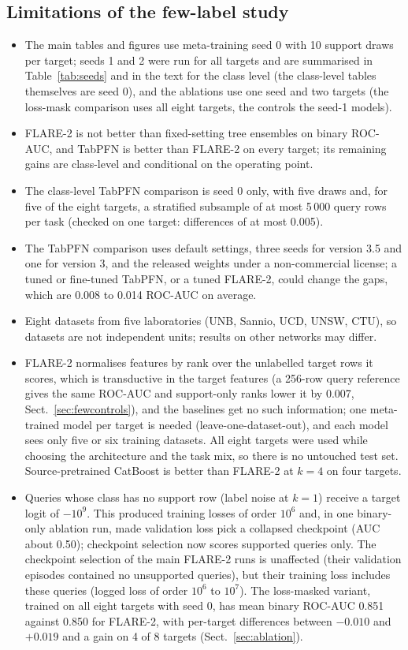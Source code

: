 \documentclass[11pt]{article}
\begin{document}
\subsection{Limitations of the few-label study}
\begin{itemize}
\item The main tables and figures use meta-training seed 0 with 10 support draws per target; seeds 1 and 2 were run for all targets and are summarised in Table~\ref{tab:seeds} and in the text for the class level (the class-level tables themselves are seed 0), and the ablations use one seed and two targets (the loss-mask comparison uses all eight targets, the controls the seed-1 models).
\item FLARE-2 is not better than fixed-setting tree ensembles on binary ROC-AUC, and TabPFN is better than FLARE-2 on every target; its remaining gains are class-level and conditional on the operating point.
\item The class-level TabPFN comparison is seed 0 only, with five draws and, for five of the eight targets, a stratified subsample of at most 5\,000 query rows per task (checked on one target: differences of at most 0.005).
\item The TabPFN comparison uses default settings, three seeds for version 3.5 and one for version 3, and the released weights under a non-commercial license; a tuned or fine-tuned TabPFN, or a tuned FLARE-2, could change the gaps, which are 0.008 to 0.014 ROC-AUC on average.
\item Eight datasets from five laboratories (UNB, Sannio, UCD, UNSW, CTU), so datasets are not independent units; results on other networks may differ.
\item FLARE-2 normalises features by rank over the unlabelled target rows it scores, which is transductive in the target features (a 256-row query reference gives the same ROC-AUC and support-only ranks lower it by 0.007, Sect.~\ref{sec:fewcontrols}), and the baselines get no such information; one meta-trained model per target is needed (leave-one-dataset-out), and each model sees only five or six training datasets. All eight targets were used while choosing the architecture and the task mix, so there is no untouched test set. Source-pretrained CatBoost is better than FLARE-2 at $k=4$ on four targets.
\item Queries whose class has no support row (label noise at $k=1$) receive a target logit of $-10^{9}$. This produced training losses of order $10^{6}$ and, in one binary-only ablation run, made validation loss pick a collapsed checkpoint (AUC about 0.50); checkpoint selection now scores supported queries only. The checkpoint selection of the main FLARE-2 runs is unaffected (their validation episodes contained no unsupported queries), but their training loss includes these queries (logged loss of order $10^{6}$ to $10^{7}$). The loss-masked variant, trained on all eight targets with seed 0, has mean binary ROC-AUC 0.851 against 0.850 for FLARE-2, with per-target differences between $-0.010$ and $+0.019$ and a gain on 4 of 8 targets (Sect.~\ref{sec:ablation}).

\end{itemize}
\end{document}
